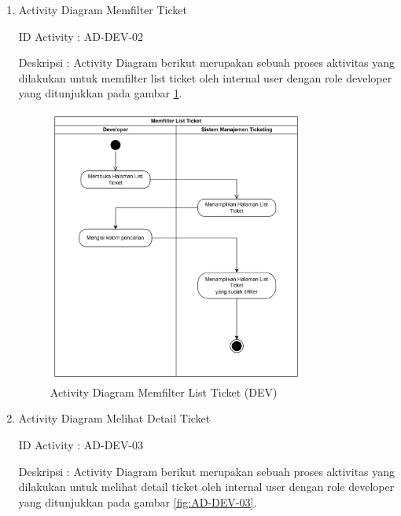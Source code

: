 \documentclass[12pt]{article}
\begin{document}
\begin{enumerate}[label=\textbf{4.\arabic*.}]
\begin{enumerate}[label=\textbf{4.1.\arabic*.}, wide, labelwidth=!, labelindent=0pt]
\begin{enumerate}[label=\textbf{4.1.7.\arabic*.}, wide, labelwidth=!, labelindent=0pt]
\begin{enumerate}[label=\arabic*.]
                \item Activity Diagram Memfilter Ticket

                \noindent ID Activity	: AD-DEV-02

                \noindent Deskripsi	: Activity Diagram berikut merupakan sebuah proses aktivitas yang dilakukan untuk memfilter list ticket oleh internal user dengan role developer yang ditunjukkan pada gambar \ref{fig:AD-DEV-02}.


                \begin{figure}[H]
                    \centering \includegraphics[width=0.8\textwidth]{images/activity/idev/Memfilter List Ticket.png}
                    \caption{Activity Diagram Memfilter List Ticket (DEV)}
                    \label{fig:AD-DEV-02}
                \end{figure}

                \item Activity Diagram Melihat Detail Ticket

                \noindent ID Activity	: AD-DEV-03

                \noindent Deskripsi	: Activity Diagram berikut merupakan sebuah proses aktivitas yang dilakukan untuk melihat detail ticket oleh internal user dengan role developer yang ditunjukkan pada gambar \ref{fig:AD-DEV-03}.



\end{enumerate}
\end{enumerate}
\end{enumerate}
\end{enumerate}
\end{document}
